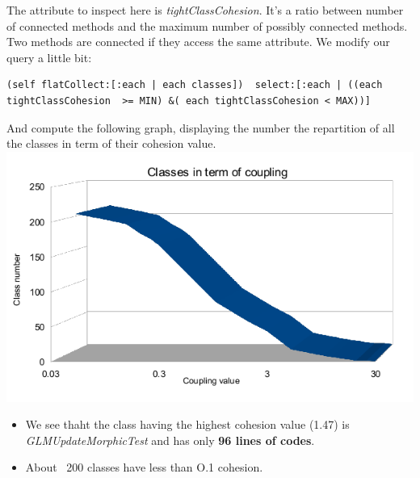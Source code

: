 \documentclass[11pt,a4paper]{article}
\begin{document}
The attribute to inspect here is \textit{tightClassCohesion}. It's a ratio between number of connected methods and the maximum number of possibly connected methods. Two methods are connected if they access the same attribute. 
We modify our query a little bit:
\begin{lstlisting}
(self flatCollect:[:each | each classes])  select:[:each | ((each tightClassCohesion  >= MIN) &( each tightClassCohesion < MAX))]
\end{lstlisting}

And compute the following graph, displaying the number the repartition of all the classes in term of their cohesion value.\\
\includegraphics[width=\textwidth]{cohesion_result}

\begin{itemize}
\item We see thaht the class having the highest cohesion value (1.47) is \textit{GLMUpdateMorphicTest} and has only \textbf{96 lines of codes}.\\

\item About ~200 classes have less than O.1 cohesion. 
\end{itemize}
\end{document}
